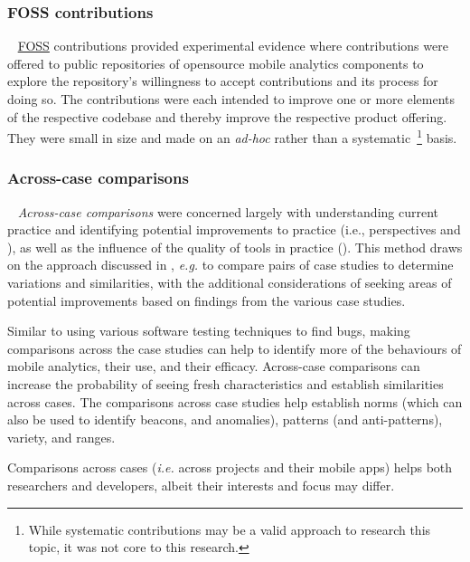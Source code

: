 \subsubsection{FOSS contributions}~\label{foss-contributions-research-methods}
\href{glossary-FOSS}{FOSS} contributions provided experimental evidence where contributions were offered to public repositories of opensource mobile analytics components to explore the repository's willingness to accept contributions and its process for doing so. The contributions were each intended to improve one or more elements of the respective codebase and thereby improve the respective product offering. They were small in size and made on an \emph{ad-hoc} rather than a systematic~\footnote{While systematic contributions may be a valid approach to research this topic, it was not core to this research.} basis.


\subsubsection{Across-case comparisons}~\label{across-case-comparisons-research-method}
\textit{Across-case comparisons} were concerned largely with understanding current practice and identifying potential improvements to practice (i.e., perspectives \uuse and \iuse), as well as the influence of the quality of tools in practice (\itools). This method draws on the approach discussed in \citet[pp. 567-569]{seaman1999_qualitative_methods_in_esse}, \textit{e.g.} to compare pairs of case studies to determine variations and similarities, with the additional considerations of seeking areas of potential improvements based on findings from the various case studies.

Similar to using various software testing techniques to find bugs, making comparisons across the case studies can help to identify more of the behaviours of mobile analytics, their use, and their efficacy. Across-case comparisons can increase the probability of seeing fresh characteristics and establish similarities across cases. The comparisons across case studies help establish norms (which can also be used to identify beacons, and anomalies), patterns (and anti-patterns), variety, and ranges. 

Comparisons across cases (\textit{i.e.} across projects and their mobile apps) helps both researchers and developers, albeit their interests and focus may differ.

